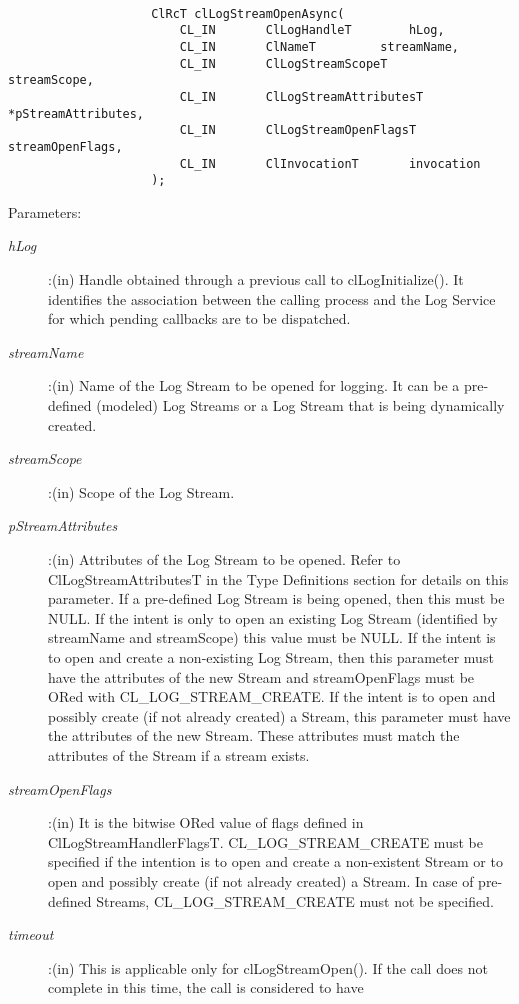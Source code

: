 \begin{flushleft}
\begin{Desc}
\begin{verbatim}
					
					ClRcT clLogStreamOpenAsync(
						CL_IN		ClLogHandleT		hLog,
						CL_IN		ClNameT			streamName,
						CL_IN 		ClLogStreamScopeT		streamScope,
						CL_IN		ClLogStreamAttributesT	*pStreamAttributes,
						CL_IN		ClLogStreamOpenFlagsT	streamOpenFlags,
						CL_IN		ClInvocationT		invocation
					);

\end{verbatim}
\normalsize
\end{Desc}
\begin{Desc}
\item[Parameters:] \begin{description}
\item[{\em hLog}]:(in) Handle obtained through a previous call to clLogInitialize(). It identifies the association between the calling process and 
the Log Service for which pending callbacks are to be dispatched.
\item[{\em streamName}]:(in) Name of the Log Stream to be opened for logging. It can be a pre-defined (modeled) Log Streams or a Log Stream that is being 
dynamically created.
\item[{\em streamScope}]:(in) Scope of the Log Stream.
\item[{\em pStreamAttributes}]:(in) Attributes of the Log Stream to be opened. Refer to ClLogStreamAttributesT in the Type Definitions section for details on this parameter. 
If a pre-defined Log Stream is being opened, then 
this must be NULL. If the intent is only to open an existing Log Stream (identified by streamName and streamScope) this value must be NULL. If the 
intent is to open and create a non-existing Log Stream, then this parameter must have the attributes of the new Stream and streamOpenFlags must
be ORed with CL\_\-LOG\_\-STREAM\_\-CREATE. If the intent is to open and possibly create (if not already created) a Stream, this parameter must have 
the attributes of the new Stream. These attributes must match the attributes of the Stream if a stream exists.
\item[{\em streamOpenFlags}]:(in) It is the bitwise ORed value of flags defined in ClLogStreamHandlerFlagsT. 
CL\_\-LOG\_\-STREAM\_\-CREATE must be specified if the 
intention is to open and create a non-existent Stream or to open and possibly create (if not already created) a Stream. In case of pre-defined Streams, 
CL\_\-LOG\_\-STREAM\_\-CREATE must not be specified.
\item[{\em timeout}]:(in) This is applicable only for clLogStreamOpen(). If the call does not complete in this time, the call is considered to have

\end{description}
\end{Desc}
\end{flushleft}
